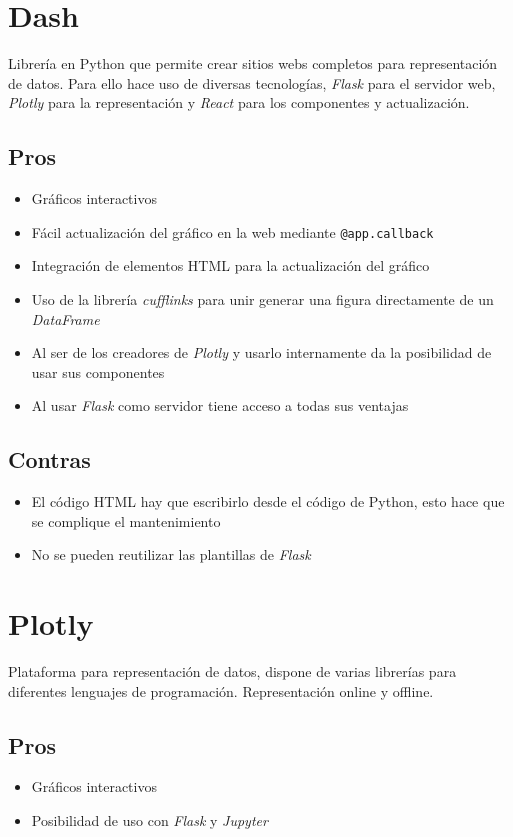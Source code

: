 
\section{Dash}
Librería en Python que permite crear sitios webs completos para representación de datos. Para ello hace uso de diversas tecnologías, \textit{Flask} para el servidor web, \textit{Plotly} para la representación y \textit{React} para los componentes y actualización.
\subsection{Pros}
\begin{itemize}
	\item Gráficos interactivos
	\item Fácil actualización del gráfico en la web mediante \verb|@app.callback|
	\item Integración de elementos HTML para la actualización del gráfico
	\item Uso de la librería \textit{cufflinks} para unir generar una figura directamente de un \textit{DataFrame}
	\item Al ser de los creadores de \textit{Plotly} y usarlo internamente da la posibilidad de usar sus componentes
	\item Al usar \textit{Flask} como servidor tiene acceso a todas sus ventajas
\end{itemize}
\subsection{Contras}
\begin{itemize}
	\item El código HTML hay que escribirlo desde el código de Python, esto hace que se complique el mantenimiento
	\item No se pueden reutilizar las plantillas de \textit{Flask}
\end{itemize}

\section{Plotly}
Plataforma para representación de datos, dispone de varias librerías para diferentes lenguajes de programación. Representación online y offline.
\subsection{Pros}
\begin{itemize}
	\item Gráficos interactivos
	\item Posibilidad de uso con \textit{Flask} y \textit{Jupyter}
\end{itemize}
